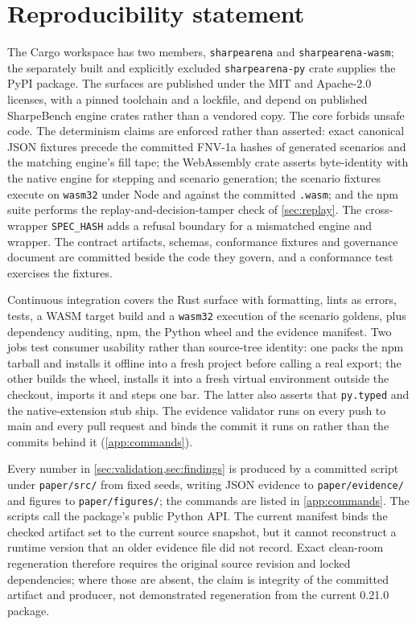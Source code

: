 \section{Reproducibility statement}\label{sec:repro}

The Cargo workspace has two members, \texttt{sharpearena} and \texttt{sharpearena-wasm}; the separately built and explicitly excluded \texttt{sharpearena-py} crate supplies the PyPI package. The surfaces are published under the MIT and Apache-2.0 licenses, with a pinned toolchain and a lockfile, and depend on published SharpeBench engine crates rather than a vendored copy. The core forbids unsafe code. The determinism claims are enforced rather than asserted: exact canonical JSON fixtures precede the committed FNV-1a hashes of generated scenarios and the matching engine's fill tape; the WebAssembly crate asserts byte-identity with the native engine for stepping and scenario generation; the scenario fixtures execute on \texttt{wasm32} under Node and against the committed \texttt{.wasm}; and the npm suite performs the replay-and-decision-tamper check of \cref{sec:replay}. The cross-wrapper \texttt{SPEC\_HASH} adds a refusal boundary for a mismatched engine and wrapper. The contract artifacts, schemas, conformance fixtures and governance document are committed beside the code they govern, and a conformance test exercises the fixtures.

Continuous integration covers the Rust surface with formatting, lints as errors, tests, a WASM target build and a \texttt{wasm32} execution of the scenario goldens, plus dependency auditing, npm, the Python wheel and the evidence manifest. Two jobs test consumer usability rather than source-tree identity: one packs the npm tarball and installs it offline into a fresh project before calling a real export; the other builds the wheel, installs it into a fresh virtual environment outside the checkout, imports it and steps one bar. The latter also asserts that \texttt{py.typed} and the native-extension stub ship. The evidence validator runs on every push to main and every pull request and binds the commit it runs on rather than the commits behind it (\cref{app:commands}).

Every number in \cref{sec:validation,sec:findings} is produced by a committed script under \texttt{paper/src/} from fixed seeds, writing JSON evidence to \texttt{paper/evidence/} and figures to \texttt{paper/figures/}; the commands are listed in \cref{app:commands}. The scripts call the package's public Python API. The current manifest binds the checked artifact set to the current source snapshot, but it cannot reconstruct a runtime version that an older evidence file did not record. Exact clean-room regeneration therefore requires the original source revision and locked dependencies; where those are absent, the claim is integrity of the committed artifact and producer, not demonstrated regeneration from the current 0.21.0 package.

